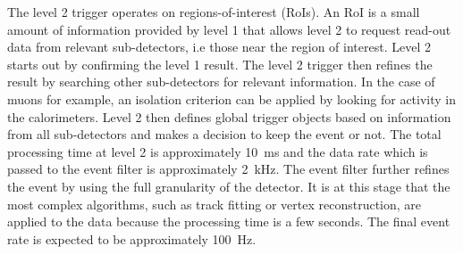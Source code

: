 The level 2 trigger operates on regions-of-interest (RoIs). An RoI is a small amount of information provided by level 1 that allows level 2 to request read-out data from relevant sub-detectors, i.e those near the region of interest. Level 2 starts out by confirming the level 1 result. The level 2 trigger then refines the result by searching other sub-detectors for relevant information. In the case of muons for example, an isolation criterion can be applied by looking for activity in the calorimeters. Level 2 then defines global trigger objects based on information from all sub-detectors and makes a decision to keep the event or not. The total processing time at level 2 is approximately 10~ms and the data rate which is passed to the event filter is approximately 2~kHz.
The event filter further refines the event by using the full granularity of the detector. It is at this stage that the most complex algorithms, such as track fitting or vertex reconstruction, are applied to the data because the processing time is a few seconds. The final event rate is expected to be approximately 100~Hz.


